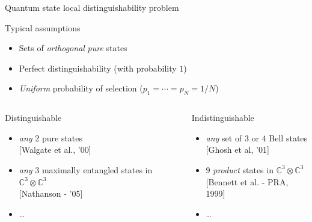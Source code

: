 \documentclass{beamer}
\def\complex{\mathbb{C}}
\begin{document}
    \begin{frame}{Quantum state local distinguishability problem}
        \begin{block}{Typical assumptions}
            \begin{itemize}
                \item Sets of \emph{orthogonal} \emph{pure} states
                \item Perfect distinguishability (with probability $1$) 
                \item \emph{Uniform} probability of selection ($p_{1} = \cdots = p_{N} = 1/N$) 
            \end{itemize}
        \end{block}
        \begin{columns}[t]
            \begin{block}{Distinguishable}
             \begin{itemize}
              \item \textit{any} 2 pure states\\
              {\footnotesize [Walgate et al., '00]}
              \item \textit{any} 3 maximally entangled states in $\complex^{3}\otimes\complex^{3}$\\
              {\footnotesize [Nathanson - '05]}
              \item \dots
             \end{itemize}
             \vspace{3pt}
             \end{block}
            \begin{block}{Indistinguishable}
             \begin{itemize}
              \item \textit{any} set of $3$ or $4$ Bell states\\
              {\footnotesize [Ghosh et al, '01]}
              \item $9$ \emph{product} states in $\complex^{3}\otimes\complex^{3}$\\
              {\footnotesize [Bennett et al. - PRA, 1999]}
              \item \dots
              \end{itemize}
             \vspace{3pt}
             \end{block}
        \end{columns}
    \end{frame}
  
\end{document}
